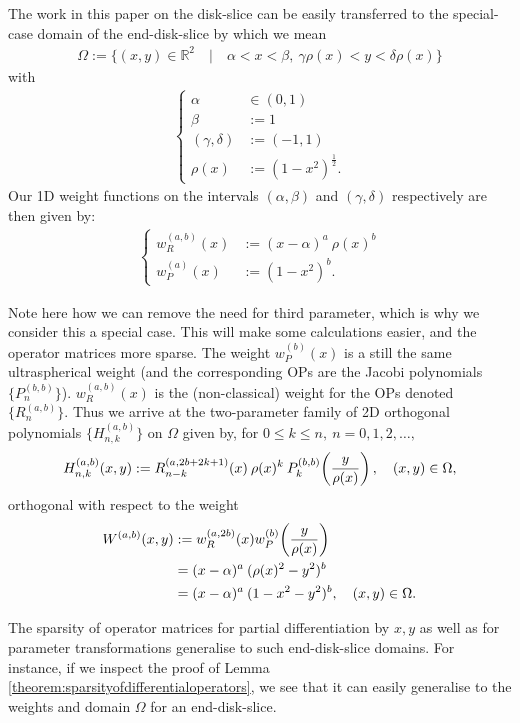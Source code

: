 \documentclass[11pt, oneside]{article}   	%
\newcommand{\half}{\frac{1}{2}}
\newcommand{\R}{\mathbb{R}}
\newcommand{\hdop}{H}
\newcommand{\hdopnkab}{\hdop_{n,k}^{(a,b)}}
\newcommand{\Wab}{{W^{(a,b)}}}
\newcommand{\jac}{{P}}
\newcommand{\genjac}{R}
\newcommand{\genjacnmk}{\genjac_{n-k}}
\newcommand{\genjacw}{w_\genjac}
\newcommand{\jacw}{w_P}
\begin{document}
The work in this paper on the disk-slice can be easily transferred to the special-case domain of the end-disk-slice by which we mean
\begin{align*}
	\Omega := \{(x,y) \in \R^2 \quad | \quad \alpha < x < \beta, \: \gamma \rho(x) < y < \delta \rho(x)\}
\end{align*}
with
\begin{align*}
\begin{cases}
\alpha &\in (0,1) \\
\beta &:= 1 \\
(\gamma, \delta) &:= (-1,1) \\
\rho(x) &:= (1-x^2)^{\half}.
\end{cases}
\end{align*}
Our 1D weight functions on the intervals $(\alpha, \beta)$ and $(\gamma, \delta)$ respectively are then given by:
\begin{align*}
\begin{cases}
\genjacw^{(a,b)}(x) &:= (x - \alpha)^{a} \: \rho(x)^{b} \\
\jacw^{(a)}(x) &:= (1-x^2)^b.
\end{cases}
\end{align*}

Note here how we can remove the need for third parameter, which is why we consider this a special case. This will make some calculations easier, and the operator matrices more sparse. The weight $\jacw^{(b)}(x)$ is a still the same ultraspherical weight (and the corresponding OPs are the Jacobi polynomials $\{\jac_n^{(b, b)}\}$). $\genjacw^{(a,b)}(x)$ is the (non-classical) weight for the OPs denoted $\{\genjac_n^{(a,b)}\}$. Thus we arrive at the two-parameter family of 2D orthogonal polynomials $\{\hdopnkab\}$ on $\Omega$ given by, for \(0 \le k \le n, \: n = 0,1,2,\dots,\)
\begin{align*}
	\hdopnkab(x,y) := \genjacnmk^{(a, 2b+2k+1)}(x) \: \rho(x)^k \: \jac_k^{(b,b)}\fpr(\frac{y}{\rho(x)}), \quad (x,y) \in \Omega, 
\end{align*}
orthogonal with respect to the weight
\begin{align*}
	\Wab(x,y) &:= \genjacw^{(a,2b)}(x) w^{(b)}_P\fpr(\frac{y}{\rho(x)}) \nonumber \\
	&= (x - \alpha)^{a} \: (\rho(x)^2 -y^2)^b \nonumber \\
	&= (x - \alpha)^{a} \: (1 - x^2 -y^2)^b , \quad (x,y) \in \Omega.
\end{align*}

The sparsity of operator matrices for partial differentiation by $x, y$ as well as for parameter transformations generalise to such end-disk-slice domains. For instance, if we inspect the proof of Lemma \ref{theorem:sparsityofdifferentialoperators}, we see that it can easily generalise to the weights and domain $\Omega$ for an end-disk-slice.
\end{document}
